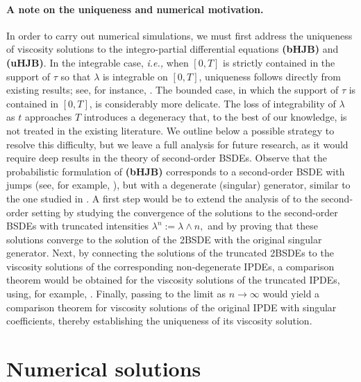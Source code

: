 \documentclass[11pt,a4paper]{article}
\theoremstyle{thmstyleone}%
\theoremstyle{thmstyletwo}%
\theoremstyle{thmstylethree}%
\begin{document}
\paragraph{A note on the uniqueness and numerical motivation.} In order to carry out numerical simulations, we must first address the uniqueness of viscosity solutions to the integro-partial differential equations \textbf{(bHJB)} and \textbf{(uHJB)}. In the integrable case, \textit{i.e.,} when $[0,T]$ is strictly contained in the support of $\tau$ so that $\lambda$ is integrable on $[0,T]$, uniqueness follows directly from existing results; see, for instance, \cite[Section~5]{seydel2009existence}. The bounded case, in which the support of $\tau$ is contained in $[0,T]$, is considerably more delicate. The loss of integrability of $\lambda$ as $t$ approaches $T$ introduces a degeneracy that, to the best of our knowledge, is not treated in the existing literature. We outline below a possible strategy to resolve this difficulty, but we leave a full analysis for future research, as it would require deep results in the theory of second-order BSDEs. Observe that the probabilistic formulation of \textbf{(bHJB)} corresponds to a second-order BSDE with jumps (see, for example, \cite[Section~3.4]{gennaro20252bsde}), but with a degenerate (singular) generator, similar to the one studied in \cite{jeanblanc2014note}. A first step would be to extend the analysis of \cite{jeanblanc2014note} to the second-order setting by studying the convergence of the solutions to the second-order BSDEs with truncated intensities
$\lambda^n := \lambda \wedge n,$
and by proving that these solutions converge to the solution of the 2BSDE with the original singular generator. Next, by connecting the solutions of the truncated 2BSDEs to the viscosity solutions of the corresponding non-degenerate IPDEs, a comparison theorem would be obtained for the viscosity solutions of the truncated IPDEs, using, for example, \cite{alvarez1996viscosity,mou2015uniqueness}. Finally, passing to the limit as $n \to \infty$ would yield a comparison theorem for viscosity solutions of the original IPDE with singular coefficients, thereby establishing the uniqueness of its viscosity solution.

\section{Numerical solutions}\label{chap5}
\end{document}
